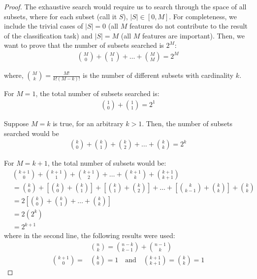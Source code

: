 \documentclass[12pt, twoside, a4paper]{article}
\begin{document}
\begin{proof}
The exhaustive search would require us to search through the space of all subsets, where for each subset (call it $S$), $|S| \in \left[ 0, M \right]$. For completeness, we include the trivial cases of $|S|=0$ (all $M$ features do not contribute to the result of the classification task) and $|S|=M$ (all $M$ features are important). Then, we want to prove that the number of subsets searched is $2^M$:
\begin{align*}
{{M}\choose{0}} + {{M}\choose{1}} + \dots + {{M}\choose{M}} = 2^M
\end{align*}

where, ${{M}\choose{k}} = \frac{M!}{k!(M-k)!}$ is the number of different subsets with cardinality $k$. 

For $M=1$, the total number of subsets searched is:
\begin{align*}
{{1}\choose{0}} + {{1}\choose{1}} = 2^1
\end{align*}

Suppose $M=k$ is true, for an arbitrary $k>1$. Then, the number of subsets searched would be
\begin{align*}
{{k}\choose{0}} + {{k}\choose{1}} + {{k}\choose{2}} + \dots + {{k}\choose{k}} = 2^k 
\end{align*}

For $M=k+1$, the total number of subsets would be:
\begin{align*}
&{{k+1}\choose{0}} + {{k+1}\choose{1}} + {{k+1}\choose{2}} + \dots + {{k+1}\choose{k}} + {{k+1}\choose{k+1}} \\
&= {{k}\choose{0}} + \left[ {{k}\choose{0}} + {{k}\choose{1}} \right] + \left[ {{k}\choose{1}} + {{k}\choose{2}} \right] + \dots + \left[ {{k}\choose{k-1}} + {{k}\choose{k}} \right] + {{k}\choose{k}} \\
&= 2 \left[ {{k}\choose{0}} + {{k}\choose{1}} + \dots + {{k}\choose{k}} \right] \\
&= 2 \left(2^k \right) \\
&= 2^{k+1}
\end{align*}
where in the second line, the following results were used:
\begin{align*}
&{{n}\choose{k}} = {{n-k}\choose{k-1}} + {{n-1}\choose{k}} \\
{{k+1}\choose{0}} = &{{k}\choose{0}} = 1 \quad \text{and} \quad {{k+1}\choose{k+1}} = {{k}\choose{k}} = 1
\end{align*}
\end{proof}
\end{document}
